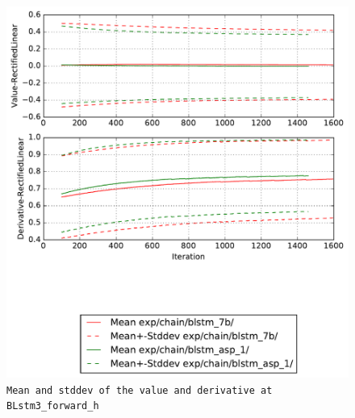 \documentclass[prl,10pt,twocolumn]{revtex4}
\begin{document}
\newpage
\begin{figure}[h]
  \begin{center}
    \caption{\texttt{Mean and stddev of the value and derivative at BLstm3\_forward\_h}}
    \includegraphics[width=\textwidth]{exp/chain/blstm_7b/report/nonlinstats_BLstm3_forward_h.pdf}
  \end{center}
\end{figure}
\clearpage
\end{document}
